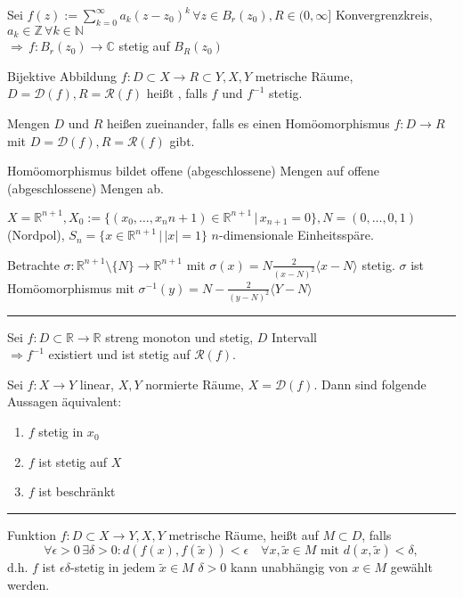 \begin{proposition}
	Sei $f(z) := \sum_{k=0}^\infty a_k(z-z_0)^k\,\forall z\in B_r(z_0), R\in(0,\infty]$ Konvergrenzkreis, $a_k\in\mathbb{Z}\, \forall k\in \mathbb{N}$\\
	$\Rightarrow\, f:B_r(z_0) \to \mathbb{C}$ stetig auf $B_R(z_0)$
\end{proposition}
\addtocounter{theorem}{2}
\begin{definition}
	Bijektive Abbildung $f:D\subset X\to R\subset Y, X,Y$ metrische Räume, $D=\mathcal{D}(f), R=\mathcal{R}(f)$ heißt , falls $f$ und $f^{-1}$ stetig.
	
	Mengen $D$ und $R$ heißen  zueinander, falls es einen Homöomorphismus $f:D\to R$ mit $D=\mathcal{D}(f), R=\mathcal{R}(f)$ gibt.
	
	 Homöomorphismus bildet offene (abgeschlossene) Mengen auf offene (abgeschlossene) Mengen ab.
\end{definition}
\begin{example}
	
	$X=\mathbb{R}^{n+1}, X_0 := \{(x_0, \dotsc, x_n{n+1}) \in\mathbb{R}^{n+1} \,|\, x_{n+1}=0\}, N = (0,\dotsc, 0,1)$ (Nordpol), $S_n = \{ x\in\mathbb{R}^{n+1} \,|\, |x|=1\}$ $n$-dimensionale Einheitsspäre.
	
	Betrachte $\sigma: \mathbb{R}^{n+1} \setminus\{ N\} \rightarrow \mathbb{R}^{n+1}$ mit $\sigma(x) = N \frac{2}{(x-N)^2}\langle x-N\rangle$ stetig. $\sigma$ ist Homöomorphismus mit $\sigma^{-1}(y) = N - \frac{2}{(y-N)^2}\langle Y-N\rangle$
\end{example}
\rule{4cm}{0.4pt}
\begin{proposition}
	Sei $f:D\subset \mathbb{R}\to \mathbb{R}$ streng monoton und stetig, $D$ Intervall \\
	$\Rightarrow f^{-1}$ existiert und ist stetig auf $\mathcal{R}(f)$.
\end{proposition}
\begin{proposition}
	Sei $f:X\to Y$ linear, $X,Y$ normierte Räume, $X=\mathcal{D}(f)$. Dann sind folgende Aussagen äquivalent:
	\begin{enumerate}[label={\arabic*)}]
		\item $f$ stetig in $x_0$
		\item $f$ ist stetig auf $X$
		\item $f$ ist beschränkt
	\end{enumerate}
\end{proposition}
\rule{4cm}{0.4pt}
\begin{definition}
	Funktion $f:D\subset X\to Y, X,Y$ metrische Räume, heißt  auf $M\subset D$, falls \[ \forall \epsilon > 0 \,\exists \delta > 0: d(f(x), f(\tilde{x})) < \epsilon\quad \forall x,\tilde{x}\in M \text{ mit $d(x,\tilde{x}) < \delta$}, \]
	d.h. $f$ ist $\epsilon\delta$-stetig in jedem $\tilde{x}\in M$  $\delta > 0$ kann unabhängig von $x\in M$ gewählt werden.
\end{definition}

